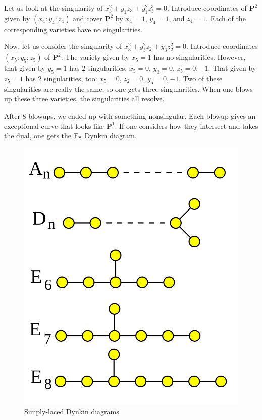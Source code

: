 \documentclass [11 pt, oneside] {article}
\begin{document}
\begin{example}
Let us look at the singularity of $x_3^2+y_1z_3+y_1^2z_3^3 =0 $. Introduce coordinates of $\mathbf{P}^2$ given by $(x_4:y_4:z_4)$ and cover $\mathbf{P}^2$ by $x_4=1$, $y_4=1$, and $z_4=1$. Each of the corresponding varieties have no singularities.

Now, let us consider the singularity of $x_3^2+y_3^2z_2+y_3z_2^2 =0$. Introduce coordinates $(x_5:y_5:z_5)$ of $\mathbf{P}^2$. The variety given by $x_5=1$ has no singularities. However, that given by $y_5=1$ has $2$ singularities: $x_5=0$, $y_3=0$, $z_5=0,-1$. That given by $z_5=1$ has $2$ singularities, too: $x_5=0$, $z_2=0$, $y_5=0,-1$. Two of these singularities are really the same, so one gets three singularities. 
When one blows up these three varieties, the singularities all resolve.
\end{example} 

After $8$ blowups, we ended up with something nonsingular. Each blowup gives an exceptional curve that looks like $\mathbf{P}^1$. If one considers how they intersect and takes the dual, one gets the $\operatorname{E}_8$ Dynkin diagram. 

\begin{figure}
	\begin{center}
		\includegraphics[scale=0.225]{images/simply_laced}
		\caption{Simply-laced Dynkin diagrams.}
	\end{center}
\end{figure}
\end{document}
